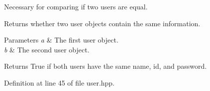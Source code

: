 Necessary for comparing if two users are equal. 

Returns whether two user objects contain the same information. 
\begin{DoxyParams}{Parameters}
{\em a} & The first user object. \\
\hline
{\em b} & The second user object. \\
\hline
\end{DoxyParams}
\begin{DoxyReturn}{Returns}
True if both users have the same name, id, and password. 
\end{DoxyReturn}


Definition at line 45 of file user.\+hpp.

